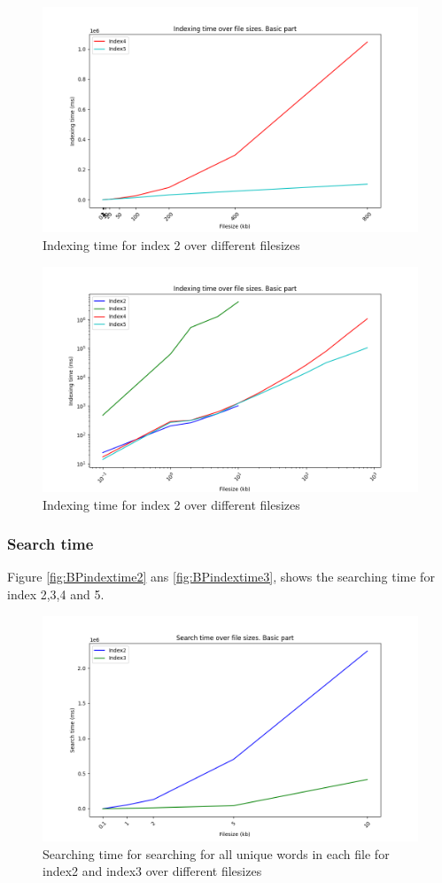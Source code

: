 \begin{figure}[H]
    \centering
    \includegraphics[width=.8\textwidth]{LaTeX/Figures/BasicPart/BPIndexing[4, 5].png}
    \caption{Indexing time for index 2 over different filesizes}
    \label{fig:BPindextime45}
\end{figure}

\begin{figure}[H]
    \centering
    \includegraphics[width=.8\textwidth]{LaTeX/Figures/BasicPart/BPIndexing[2, 3, 4, 5].png}
    \caption{Indexing time for index 2 over different filesizes}
    \label{fig:BPindextime2345}
\end{figure}

\subsubsection{Search time}
Figure \ref{fig:BPindextime2} ans \ref{fig:BPindextime3}, shows the searching time for index 2,3,4 and 5.

\begin{figure}[H]
    \centering
    \includegraphics[width=.8\textwidth]{LaTeX/Figures/BasicPart/BPSearch[2, 3].png}
    \caption{Searching time for searching for all unique words in each file for index2 and index3 over different filesizes}
    \label{fig:BPsearch23}
\end{figure}

